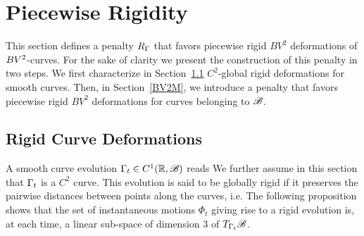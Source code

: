 
\section{Piecewise Rigidity}\label{PWR}

This section defines a penalty $R_\Gamma$ that favors piecewise rigid $BV^2$ deformations of $BV^{2}$-curves.  For the sake of clarity we present the construction of this penalty in two steps. We first characterize in Section~\ref{GRD} $C^2$-global rigid deformations for  smooth curves. Then, in Section~\ref{BV2M}, we introduce a  penalty that favors  piecewise rigid $BV^2$ deformations for curves belonging to $\mathcal{B}$.


\subsection{Rigid Curve Deformations}\label{GRD}

A smooth curve evolution $\Gamma_t\in C^1(\mathbb{R}, \mathcal{B})$ reads
 We further assume in this section that $\Gamma_t$ is a $C^2$ curve. This evolution is said to be globally rigid if it preserves the pairwise distances between points along the curves, i.e. 
The following proposition shows that the set of instantaneous motions $\Phi_t$ giving rise to a rigid evolution  is, at each time, a linear sub-space of dimension 3 of $T_{\Gamma_t} \mathcal{B}$.

